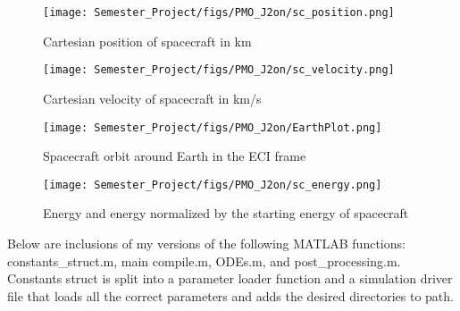 \documentclass[12pt]{article}
\begin{document}
\begin{figure}[H]
\centering
    \texttt{[image: Semester\_Project/figs/PMO\_J2on/sc\_position.png]}
    \caption{Cartesian position of spacecraft in km}
\end{figure}
\begin{figure}[H]
\centering
    \texttt{[image: Semester\_Project/figs/PMO\_J2on/sc\_velocity.png]}
    \caption{Cartesian velocity of spacecraft in km/s}
\end{figure}
\begin{figure}[H]
\centering
    \texttt{[image: Semester\_Project/figs/PMO\_J2on/EarthPlot.png]}
    \caption{Spacecraft orbit around Earth in the ECI frame}
\end{figure}
\begin{figure}[H]
\centering
    \texttt{[image: Semester\_Project/figs/PMO\_J2on/sc\_energy.png]}
    \caption{Energy and energy normalized by the starting energy of spacecraft}
\end{figure}

Below are inclusions of my versions of the following MATLAB functions: constants\_struct.m, main compile.m, ODEs.m, and
post\_processing.m. Constants struct is split into a parameter loader function and a simulation driver file that loads all the correct parameters and adds the desired directories to path.






 


\end{document}
